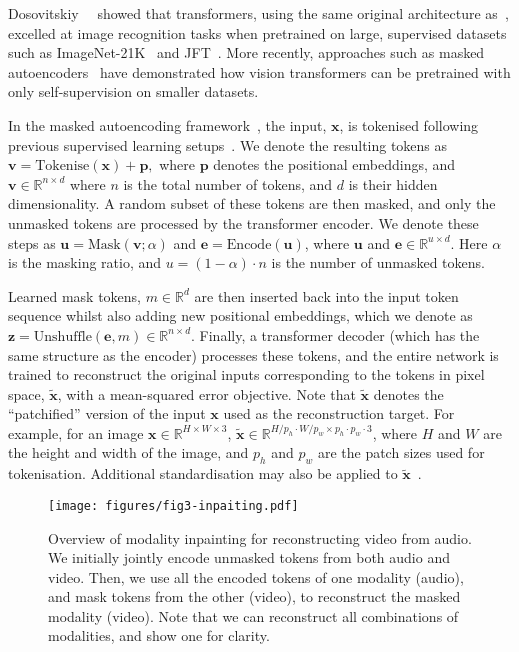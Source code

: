 \documentclass[10pt,twocolumn,letterpaper]{article}
\begin{document}
Dosovitskiy~\etal~\cite{dosovitskiy_iclr_2021} showed that transformers, using the same original architecture as~\cite{vaswani_neurips_2017}, excelled at image recognition tasks when pretrained on large, supervised datasets such as ImageNet-21K~\cite{deng_cvpr_2009} and JFT~\cite{sun_iccv_2017}.
More recently, approaches such as masked autoencoders~\cite{he2022masked} have demonstrated how vision transformers can be pretrained with only self-supervision on smaller datasets.

In the masked autoencoding framework~\cite{he2022masked}, the input, $\mathbf{x}$, is tokenised following previous supervised learning setups~\cite{dosovitskiy_iclr_2021,arnab2021vivit,gong2021ast}.
We denote the resulting tokens as $\mathbf{v} = \text{Tokenise}(\mathbf{x}) + \mathbf{p},$ where $\mathbf{p}$ denotes the positional embeddings, and
$\mathbf{v} \in \mathbb{R}^{n \times d}$ where $n$ is the total number of tokens, and $d$ is their hidden dimensionality.
A random subset of these tokens are then masked, and only the unmasked tokens are processed by the transformer encoder.
We denote these steps as $\mathbf{u} = \text{Mask}(\mathbf{v} ; \alpha)$ and $\mathbf{e} = \text{Encode}(\mathbf{u})$, where $\mathbf{u}$ and $\mathbf{e} \in \mathbb{R}^{u \times d}$.
Here $\alpha$ is the masking ratio, and $u = (1 - \alpha) \cdot n$ is the number of unmasked tokens.

Learned mask tokens, $m \in \mathbb{R}^{d}$ are then inserted back into the input token sequence whilst also adding new positional embeddings, which we denote as $\mathbf{z} = \text{Unshuffle}(\mathbf{e}, m) \in \mathbb{R}^{n \times d}$. 
Finally, a transformer decoder (which has the same structure as the encoder) processes these tokens, and the entire network is trained to reconstruct the original inputs corresponding to the tokens in pixel space, $\mathbf{\tilde{x}}$, with a mean-squared error objective.
Note that $\mathbf{\tilde{x}}$ denotes the ``patchified'' version of the input $\mathbf{x}$ used as the reconstruction target.
For example, for an image $\mathbf{x} \in \mathbb{R}^{H \times W \times 3}$,  $\mathbf{\tilde{x}} \in \mathbb{R}^{ H / p_h \cdot W / p_w \times  p_h \cdot p_w \cdot 3}$, where $H$ and $W$ are the height and width of the image, and $p_h$ and $p_w$ are the patch sizes used for tokenisation.
Additional standardisation may also be applied to $\mathbf{\tilde{x}}$~\cite{he2022masked,tong2022videomae}.

\begin{figure*}[t]
    \centering
    \vspace{-1\baselineskip}
    \texttt{[image: figures/fig3-inpaiting.pdf]}
    \vspace{-0.6\baselineskip}
    \caption{
    	Overview of modality inpainting for reconstructing video from audio.
    	We initially jointly encode unmasked tokens from both audio and video.
    	Then, we use all the encoded tokens of one modality (\ie audio), and mask tokens from the other (\ie video), to reconstruct the masked modality (\ie video).
    	Note that we can reconstruct all combinations of modalities, and show one for clarity.
    		}
	\vspace{-1.5\baselineskip}
    \label{fig:model_inpainting}
\end{figure*} 
\end{document}

